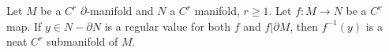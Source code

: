 Let $M$ be a $C^r$ $\partial$-manifold and $N$ a $C^r$ manifold, $r \geqslant 1$. Let $f: M \to N$ be a $C^r$ map. If $y \in N - \partial N$ is a regular value for both $f$ and $f|\partial M$, then $f^{-1}(y)$ is a neat $C^r$ submanifold of $M$.
